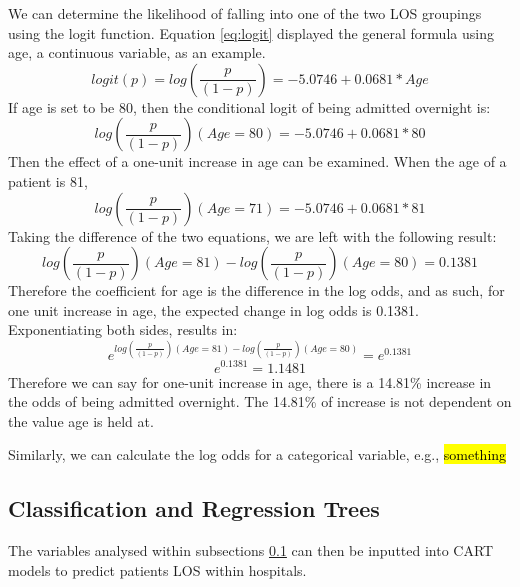 \documentclass[../thesis.tex]{subfiles}
\begin{document}
We can determine the likelihood of falling into one of the two LOS groupings using the logit function. Equation \ref{eq:logit} displayed the general formula using age, a continuous variable, as an example.
\begin{equation}\label{eq:logit}
    logit(p) = log\left(\frac{p}{(1-p)}\right) = -5.0746 +0.0681*Age
\end{equation}
If age is set to be 80, then the conditional logit of being admitted overnight is:
\begin{equation}
    log\left(\frac{p}{(1-p)}\right)(Age =80) = -5.0746 +0.0681*80 
\end{equation}
Then the effect of a one-unit increase in age can be examined. When the age of a patient is 81,
\begin{equation}
    log\left(\frac{p}{(1-p)}\right)(Age = 71) = -5.0746 +0.0681*81 
\end{equation}
Taking the difference of the two equations, we are left with the following result:
\begin{equation}
log\left(\frac{p}{(1-p)}\right)(Age =81) - log\left(\frac{p}{(1-p)}\right)(Age = 80) = 0.1381
\end{equation}
Therefore the coefficient for age is the difference in the log odds, and as such, for one unit increase in age, the expected change in log odds is 0.1381. Exponentiating both sides, results in:
\begin{equation}
    e^{log\left(\frac{p}{(1-p)}\right)(Age =81) - log\left(\frac{p}{(1-p)}\right)(Age = 80)} = e^{0.1381}
\end{equation}
\begin{equation}
     e^{0.1381} = 1.1481
\end{equation}
Therefore we can say for one-unit increase in age, there is a 14.81\% increase in the odds of being admitted overnight. The 14.81\% of increase is not dependent on the value age is held at.


Similarly, we can calculate the log odds for a categorical variable, e.g., \hl{something}



\subsection{Classification and Regression Trees}
The variables analysed within subsections \ref{} can then be inputted into CART models to predict patients LOS within hospitals.
\end{document}
